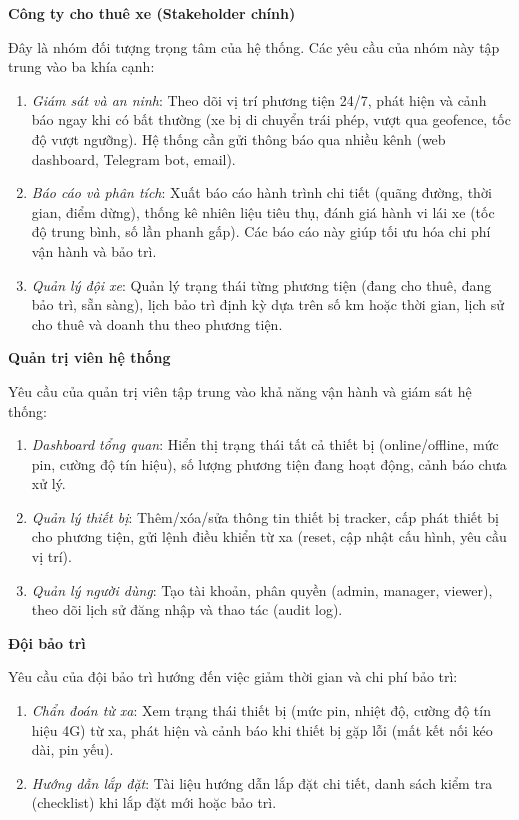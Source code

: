 \documentclass[a4paper]{extarticle}
\providecommand{\tightlist}{%
  \setlength{\itemsep}{0pt}\setlength{\parskip}{0pt}}
\begin{document}
\textbf{Công ty cho thuê xe (Stakeholder chính)}

Đây là nhóm đối tượng trọng tâm của hệ thống. Các yêu cầu của nhóm này
tập trung vào ba khía cạnh:

\begin{enumerate}
\def\labelenumi{\arabic{enumi}.}
\tightlist
\item
  \emph{Giám sát và an ninh}: Theo dõi vị trí phương tiện 24/7, phát
  hiện và cảnh báo ngay khi có bất thường (xe bị di chuyển trái phép,
  vượt qua geofence, tốc độ vượt ngưỡng). Hệ thống cần gửi thông báo qua
  nhiều kênh (web dashboard, Telegram bot, email).
\item
  \emph{Báo cáo và phân tích}: Xuất báo cáo hành trình chi tiết (quãng
  đường, thời gian, điểm dừng), thống kê nhiên liệu tiêu thụ, đánh giá
  hành vi lái xe (tốc độ trung bình, số lần phanh gấp). Các báo cáo này
  giúp tối ưu hóa chi phí vận hành và bảo trì.
\item
  \emph{Quản lý đội xe}: Quản lý trạng thái từng phương tiện (đang cho
  thuê, đang bảo trì, sẵn sàng), lịch bảo trì định kỳ dựa trên số km
  hoặc thời gian, lịch sử cho thuê và doanh thu theo phương tiện.
\end{enumerate}

\textbf{Quản trị viên hệ thống}

Yêu cầu của quản trị viên tập trung vào khả năng vận hành và giám sát hệ
thống:

\begin{enumerate}
\def\labelenumi{\arabic{enumi}.}
\tightlist
\item
  \emph{Dashboard tổng quan}: Hiển thị trạng thái tất cả thiết bị
  (online/offline, mức pin, cường độ tín hiệu), số lượng phương tiện
  đang hoạt động, cảnh báo chưa xử lý.
\item
  \emph{Quản lý thiết bị}: Thêm/xóa/sửa thông tin thiết bị tracker, cấp
  phát thiết bị cho phương tiện, gửi lệnh điều khiển từ xa (reset, cập
  nhật cấu hình, yêu cầu vị trí).
\item
  \emph{Quản lý người dùng}: Tạo tài khoản, phân quyền (admin, manager,
  viewer), theo dõi lịch sử đăng nhập và thao tác (audit log).
\end{enumerate}

\textbf{Đội bảo trì}

Yêu cầu của đội bảo trì hướng đến việc giảm thời gian và chi phí bảo
trì:

\begin{enumerate}
\def\labelenumi{\arabic{enumi}.}
\tightlist
\item
  \emph{Chẩn đoán từ xa}: Xem trạng thái thiết bị (mức pin, nhiệt độ,
  cường độ tín hiệu 4G) từ xa, phát hiện và cảnh báo khi thiết bị gặp
  lỗi (mất kết nối kéo dài, pin yếu).
\item
  \emph{Hướng dẫn lắp đặt}: Tài liệu hướng dẫn lắp đặt chi tiết, danh
  sách kiểm tra (checklist) khi lắp đặt mới hoặc bảo trì.
\end{enumerate}
\end{document}
